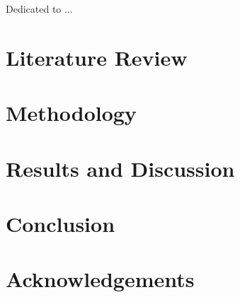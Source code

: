 \documentclass[b5paper, 10pt, twoside]{book}
\newenvironment{dedication}
  {\clearpage \thispagestyle{empty} \vspace*{\stretch{1}} \itshape \raggedleft}
  {\par \vspace{\stretch{3}} \clearpage}
\begin{document}
\clearpage

\begin{dedication}

    Dedicated to ...

\end{dedication}


    \tableofcontents
    \clearpage
    \sloppy



\chapter{Literature Review}
\blindtext[7] %

\chapter{Methodology}
\blindtext[5] %

\chapter{Results and Discussion}
\blindtext[7] %

\chapter{Conclusion}
\blindtext[3] %

\chapter*{Acknowledgements}
\thispagestyle{empty}
\blindtext[1] %

\clearpage


\clearpage
\listoffigures
{}

\clearpage
\listoftables
{}

\clearpage
\end{document}
